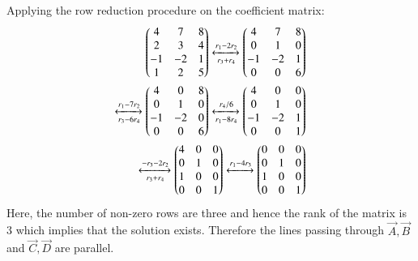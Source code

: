\documentclass[journal,12pt,twocolumn]{IEEEtran}
\begin{document}
Applying the row reduction procedure on the coefficient matrix:
\begin{align*}
	\begin{pmatrix}4 & 7 & 8\\ 2 & 3 & 4\\ -1 & -2 & 1\\ 1 & 2 & 5\end{pmatrix}
	\xleftrightarrow[r_3 + r_4]{r_1 - 2r_2}
	\begin{pmatrix}4 & 7 & 8\\ 0 & 1 & 0\\ -1 & -2 & 1\\ 0 & 0 & 6\end{pmatrix}\\
	\xleftrightarrow[r_3 - 6r_4]{r_1 - 7r_2}
	\begin{pmatrix}4 & 0 & 8\\ 0 & 1 & 0\\ -1 & -2 & 0\\ 0 & 0 & 6\end{pmatrix}
	\xleftrightarrow[r_1 - 8r_4]{r_4/6}
	\begin{pmatrix}4 & 0 & 0\\ 0 & 1 & 0\\ -1 & -2 & 1\\ 0 & 0 & 1 \end{pmatrix} \\
    \xleftrightarrow[r_3 + r_4]{-r_3 - 2r_2}
	\begin{pmatrix}4 & 0 & 0\\ 0 & 1 & 0\\ 1 & 0 & 0\\ 0 & 0 & 1\end{pmatrix}
	\xleftrightarrow{r_1 - 4r_3}
	\begin{pmatrix}0 & 0 & 0\\ 0 & 1 & 0\\ 1 & 0 & 0\\ 0 & 0 & 1\end{pmatrix}
\end{align*}
Here, the number of non-zero rows are three and hence the rank of the matrix is 3 which implies that the solution exists. Therefore the lines passing through $\vec{A}, \vec{B}$ and $\vec{C}, \vec{D}$ are parallel.
\end{document}
